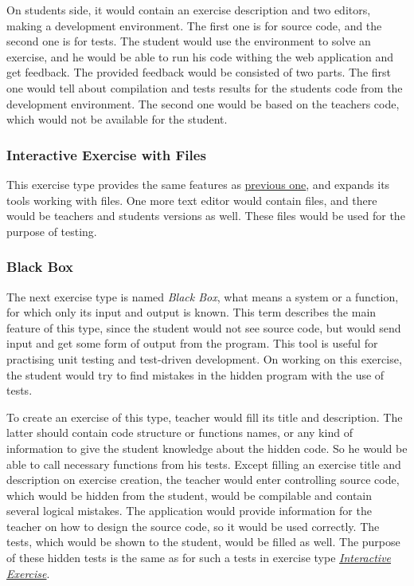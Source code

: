         On students side, it would contain an exercise description and two editors, making a development environment. The first one is for source code, and the second one is for tests. The student would use the environment to solve an exercise, and he would be able to run his code withing the web application and get feedback. The provided feedback would be consisted of two parts. The first one would tell about compilation and tests results for the students code from the development environment. The second one would be based on the teachers code, which would not be available for the student.
        
        
        \subsubsection{Interactive Exercise with Files}
        This exercise type provides the same features as \hyperref[subsubsec:whitebox]{previous one}, and expands its tools working with files. One more text editor would contain files, and there would be teachers and students versions as well. These files would be used for the purpose of testing.
        
        
        \subsubsection{Black Box}
        \label{subsubsec:blackbox}
        The next exercise type is named \textit{Black Box}, what means a system or a function, for which only its input and output is known. This term describes the main feature of this type, since the student would not see source code, but would send input and get some form of output from the program. This tool is useful for practising unit testing and test-driven development. On working on this exercise, the student would try to find mistakes in the hidden program with the use of tests.
        
        To create an exercise of this type, teacher would fill its title and description. The latter should contain code structure or functions names, or any kind of information to give the student knowledge about the hidden code. So he would be able to call necessary functions from his tests. Except filling an exercise title and description on exercise creation, the teacher would enter controlling source code, which would be hidden from the student, would be compilable and contain several logical mistakes. The application would provide information for the teacher on how to design the source code, so it would be used correctly. The tests, which would be shown to the student, would be filled as well. The purpose of these hidden tests is the same as for such a tests in exercise type \hyperref[subsubsec:whitebox]{\textit{Interactive Exercise}}.
        
